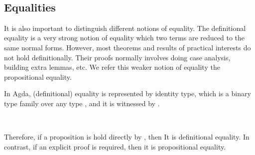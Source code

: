 \begin{code}%
\>[0]\AgdaSpace{}%
\AgdaSymbol{:}\AgdaSpace{}%
\AgdaSpace{}%
\AgdaSpace{}%
\<%
\\
\>[0]\AgdaSpace{}%
\AgdaSymbol{=}\AgdaSpace{}%
\AgdaSpace{}%
\AgdaOperator{\AgdaInductiveConstructor{,}}\AgdaSpace{}%
\<%
\end{code}

\subsection*{Equalities}

It is also important to distinguish different notions of equality. The definitional equality is a very strong notion of equality which two terms are reduced to the same normal forms. However, most theorems and results of practical interests do not hold definitionally. Their proofs normally involves doing case analysis, building extra lemmas, etc. We refer this weaker notion of equality the propositional equality.

In Agda, (definitional) equality is represented by identity type, which is a binary type family over any type , and it is witnessed by .

\begin{code}%
\>[0]\AgdaSpace{}%
\AgdaSpace{}%
\AgdaSymbol{\{}\AgdaSpace{}%
\AgdaSymbol{:}\AgdaSpace{}%
\AgdaSymbol{\}}\AgdaSpace{}%
\AgdaSymbol{(}\AgdaSpace{}%
\AgdaSymbol{:}\AgdaSpace{}%
\AgdaSymbol{)}\AgdaSpace{}%
\AgdaSymbol{:}\AgdaSpace{}%
\AgdaSpace{}%
\AgdaSpace{}%
\AgdaSpace{}%
\<%
\\
\>[0][@{}l@{\AgdaIndent{0}}]%
\>[2]\AgdaSpace{}%
\AgdaSymbol{:}\AgdaSpace{}%
\AgdaSpace{}%
\AgdaSpace{}%
\<%
\end{code}

Therefore, if a proposition is hold directly by , then It is definitional equality. In contrast, if an explicit proof is required, then it is propositional equality.

